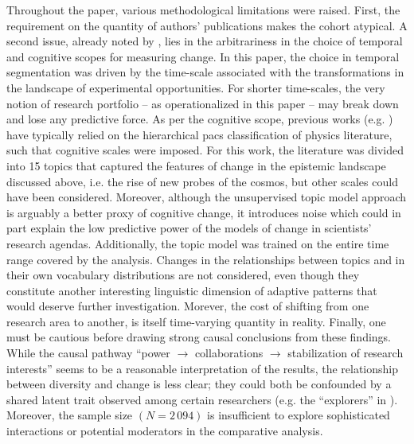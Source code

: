 \documentclass{article}
\begin{document}
Throughout the paper, various methodological limitations were raised. First, the requirement on the quantity of authors' publications makes the cohort atypical. A second issue, already noted by \citet{Gieryn1978}, lies in the arbitrariness in the choice of temporal and cognitive scopes for measuring change. In this paper, the choice in temporal segmentation was driven by the time-scale associated with the transformations in the landscape of experimental opportunities. For shorter time-scales, the very notion of research portfolio -- as operationalized in this paper --  may break down and lose any predictive force. As per the cognitive scope, previous works (e.g. \citealt{Jia2017,Aleta2019,Tripodi2020}) have typically relied on the hierarchical \gls{pacs} classification of physics literature, such that cognitive scales were imposed. For this work, the literature was divided into 15 topics that captured the features of change in the epistemic landscape discussed above, i.e. the rise of new probes of the cosmos, but other scales could have been considered. %
Moreover, although the unsupervised topic model approach is arguably a better proxy of cognitive change, it introduces noise which could in part explain the low predictive power of the models of change in scientists' research agendas. Additionally, the topic model was trained on the entire time range covered by the analysis. Changes in the relationships between topics and in their own vocabulary distributions are not considered, even though they constitute another interesting linguistic dimension of adaptive patterns that would deserve further investigation. Morever, the cost of shifting from one research area to another, is itself time-varying quantity in reality. Finally, one must be cautious before drawing strong causal conclusions from these findings. While the causal pathway ``power $\to$ collaborations $\to$ stabilization of research interests'' seems to be a reasonable interpretation of the results, the relationship between diversity and change is less clear; they could both be confounded by a shared latent trait observed among certain researchers (e.g. the ``explorers'' in \citealt{Chakresh2023}). Moreover, the sample size $(N=2\,094)$ is insufficient to explore sophisticated interactions or potential moderators in the comparative analysis. 
\end{document}
